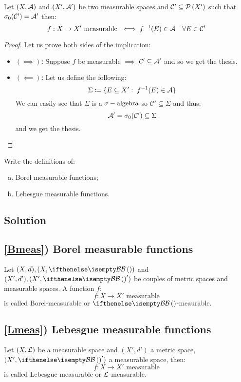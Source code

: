 Let $(X,\mathcal{A})$ and $(X',\mathcal{A}')$ be two measurable spaces and $\mathcal{C} ' \subseteq \mathcal{P}\left(X'\right)$ such that $\sigma_0(\mathcal{C}')=\mathcal{A}'$ then:
\[
    f:X\to X' \text{ measurable } \iff f^{-1}(E)\in\mathcal{A} \quad \forall E\in\mathcal{C}'    
\]

\begin{proof}
    Let us prove both sides of the implication:
    \begin{itemize}
        \item \textbf{$(\implies)$:} Suppose $f$ be measurable $\implies$ $\mathcal{C}'\subseteq \mathcal{A}'$ and so we get the thesis.
        \item \textbf{$(\impliedby)$:} Let us define the following:
            \[
                \Sigma \coloneqq \{ E\subseteq X': \; f^{-1}(E)\in\mathcal{A} \}
            \]
            We can easily see that $\Sigma$ is a $\sigma-\text{algebra}$ so $\mathcal{C}'\subseteq \Sigma$ and thus:
            \[
                \mathcal{A}'=\sigma_0(\mathcal{C}')\subseteq\Sigma    
            \]
            and we get the thesis.
    \end{itemize}
\end{proof}


\question

Write the definitions of:
\begin{enumerate}[a)]
    \item \label{Bmeas} Borel measurable functions; 
    \item \label{Lmeas} Lebesgue measurable functions.
\end{enumerate}

\subsection*{Solution}

\subsection{\ref{Bmeas}) Borel measurable functions}
Let $(X,d), (X,\B)$ and $(X',d'), (X', \B')$ be couples of metric spaces and measurable spaces. A function $f$:
\[
    f:X\to X' \text{ measurable}    
\]
is called Borel-measurable or $\B$-meaurable. 

\subsection{\ref{Lmeas}) Lebesgue measurable functions}
Let $(X,\mathcal{L})$ be a measurable space and $(X',d')$ a metric space, $(X',\B')$ a measurable space, then:
\[
    f:X\to X' \text{ measurable}    
\]
is called Lebesgue-measurable or $\mathcal{L}$-measurable.

